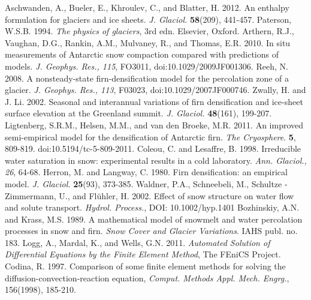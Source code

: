 \documentclass{article}%
\begin{document}
\newpage
\begin{thebibliography}{1}

  Aschwanden, A., Bueler, E., Khroulev, C., and Blatter, H. 2012. An enthalpy formulation for glaciers and ice sheets. \textit{J. Glaciol.} \textbf{58}(209), 441\mbox{-}457.
  Paterson, W.S.B. 1994. \textit{The physics of glaciers}, 3rd edn. Elsevier, Oxford.
  Arthern, R.J., Vaughan, D.G., Rankin, A.M., Mulvaney, R., and Thomas, E.R. 2010. In situ measurements of Antarctic snow compaction compared with predictions of models. \textit{J. Geophys. Res., 115}, FO3011, doi:10.1029/2009JF001306.
  Reeh, N. 2008. A nonsteady\mbox{-}state firn\mbox{-}densification model for the percolation zone of a glacier. \textit{J. Geophys. Res., 113}, F03023, doi:10.1029/2007JF000746.
  Zwally, H. and J. Li. 2002. Seasonal and interannual variations of firn densification and ice\mbox{-}sheet surface elevation at the Greenland summit. \textit{J. Glaciol.} \textbf{48}(161), 199\mbox{-}207.
  Ligtenberg, S.R.M., Helsen, M.M., and van den Broeke, M.R. 2011. An improved semi\mbox{-}empirical model for the densification of Antarctic firn. \textit{The Cryosphere}. \textbf{5}, 809\mbox{-}819. doi:10.5194/tc\mbox{-}5\mbox{-}809\mbox{-}2011.
  \bibitem{}Coleou, C. and Lesaffre, B. 1998. Irreducible water saturation in snow: experimental results in a cold laboratory. \textit{Ann. Glaciol., 26}, 64\mbox{-}68.
  Herron, M. and Langway, C. 1980. Firn densification: an empirical model. \textit{J. Glaciol.} \textbf{25}(93), 373\mbox{-}385.
  Waldner, P.A., Schneebeli, M., Schultze \mbox{-} Zimmermann, U., and Fl\"{u}hler, H. 2002. Effect of snow structure on water flow and solute transport. \textit{Hydrol. Process.}, DOI: 10.1002/hyp.1401
  Bozhinskiy, A.N. and Krass, M.S. 1989. A mathematical model of snowmelt and water percolation processes in snow and firn. \textit{Snow Cover and Glacier Variations}. IAHS publ. no. 183.
  Logg, A., Mardal, K., and Wells, G.N. 2011. \textit{Automated Solution of Differential Equations by the Finite Element Method}, The FEniCS Project.
  Codina, R. 1997. Comparison of some finite element methods for solving the diffusion\mbox{-}convection\mbox{-}reaction equation, \textit{Comput. Methods Appl. Mech. Engrg.}, 156(1998), 185\mbox{-}210.
\end{thebibliography}
\end{document}
